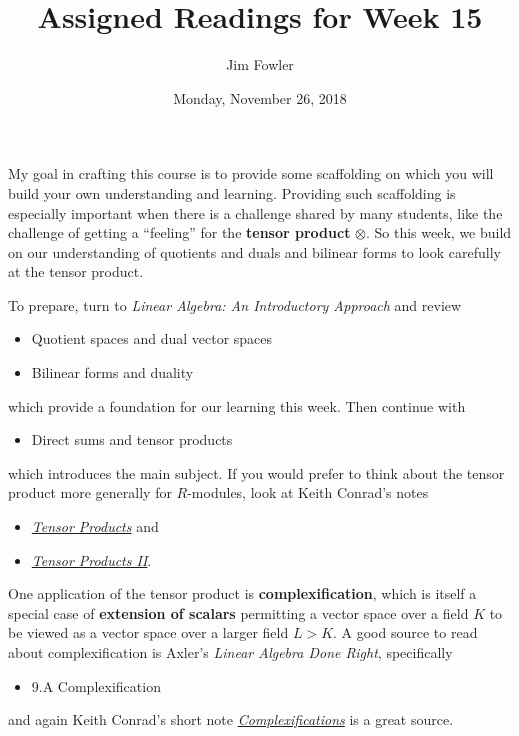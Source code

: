 \documentclass{homework}
\author{Jim Fowler}
\title{Assigned Readings for Week 15}
\date{Monday, November 26, 2018}
\begin{document}
\maketitle

My goal in crafting this course is to provide some scaffolding on
which you will build your own understanding and learning.  Providing
such scaffolding is especially important when there is a challenge
shared by many students, like the challenge of getting a ``feeling''
for the \textbf{tensor product} $\otimes$.  So this week, we build on
our understanding of quotients and duals and bilinear forms to look
carefully at the tensor product.

To prepare, turn to \textit{Linear Algebra: An Introductory Approach}
and review
\begin{itemize}
\item {} Quotient spaces and dual vector spaces
\item {} Bilinear forms and duality
\end{itemize}
which provide a foundation for our learning this week.  Then continue
with
\begin{itemize}
\item {} Direct sums and tensor products
\end{itemize}
which introduces the main subject.  If you would prefer to think about the tensor product more generally for $R$-modules, look at Keith Conrad's notes
\begin{itemize}
\item \href{http://www.math.uconn.edu/~kconrad/blurbs/linmultialg/tensorprod.pdf}{\textit{Tensor Products}} and
\item \href{http://www.math.uconn.edu/~kconrad/blurbs/linmultialg/tensorprod2.pdf}{\textit{Tensor Products II}}.
\end{itemize}

One application of the tensor product is \textbf{complexification},
which is itself a special case of \textbf{extension of scalars}
permitting a vector space over a field $K$ to be viewed as a vector
space over a larger field $L > K$.  A good source to read about
complexification is Axler's \textit{Linear Algebra Done Right},
specifically
\begin{itemize}
\item \textsection 9.A Complexification
\end{itemize}
and again Keith Conrad's short note \href{http://www.math.uconn.edu/~kconrad/blurbs/linmultialg/complexification.pdf}{\textit{Complexifications}} is a great source.
\end{document}
